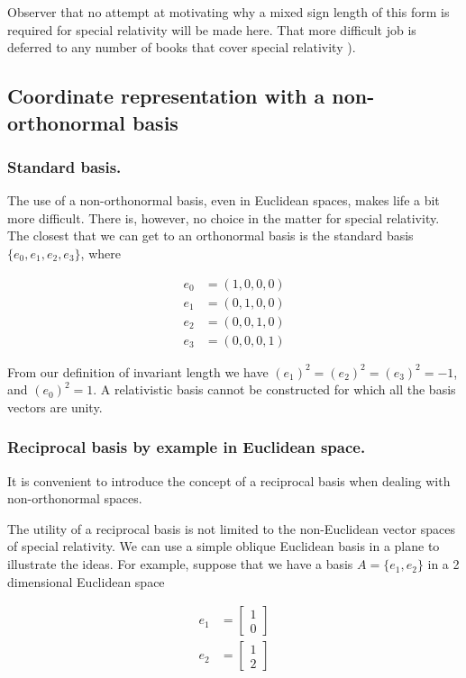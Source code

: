 \documentclass[iop,tighten]{emulateapj}
\begin{document}
Observer that no attempt at motivating why a mixed sign length of this form is required for special relativity will be made here.  That more difficult job is deferred to any number of books that cover special relativity \citep{landau1980classical}).

\subsection{Coordinate representation with a non-orthonormal basis}

\subsubsection{Standard basis.}

The use of a non-orthonormal basis, even in Euclidean spaces, makes life a bit more difficult.  There is, however, no choice in the matter for special relativity.  The closest that we can get to an orthonormal basis is the standard basis $\{e_0, e_1, e_2, e_3\}$, where

\begin{equation}\label{eqn:grahamSchmidtLorentz:70}
\begin{aligned}
e_0 &= (1, 0, 0, 0) \\
e_1 &= (0, 1, 0, 0) \\
e_2 &= (0, 0, 1, 0) \\
e_3 &= (0, 0, 0, 1) 
\end{aligned}
\end{equation}

From our definition of invariant length we have $(e_1)^2 = (e_2)^2 = (e_3)^2 = -1$, and $(e_0)^2 = 1$.  A relativistic basis cannot be constructed for which all the basis vectors are unity.

\subsubsection{Reciprocal basis by example in Euclidean space.}

It is convenient to introduce the concept of a reciprocal basis when dealing with non-orthonormal spaces.

The utility of a reciprocal basis is not limited to the non-Euclidean vector spaces of special relativity.  We can use a simple oblique Euclidean basis in a plane to illustrate the ideas.  For example, suppose that we have a basis $A = \{e_1, e_2\}$ in a 2 dimensional Euclidean space

\begin{equation}\label{eqn:grahamSchmidtLorentz:90}
\begin{aligned}
e_1 &= 
\begin{bmatrix}
1 \\
0
\end{bmatrix} \\
e_2 &= 
\begin{bmatrix}
1 \\
2
\end{bmatrix} 
\end{aligned}
\end{equation}
\end{document}
